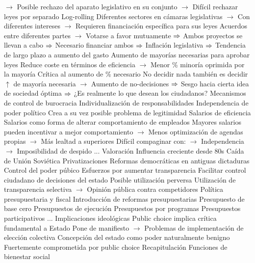 \documentclass{nuevotema}
\begin{document}
\begin{esquemal}
				\4[] $\to$ Posible rechazo del aparato legislativo en su conjunto
				\4[] $\to$ Difícil rechazar leyes por separado
				\4 Log-rolling
				\4[] Diferentes sectores en cámaras legislativas
				\4[] $\to$ Con diferentes intereses
				\4[] $\to$ Requieren financiación específica para sus leyes
				\4[] Acuerdos entre diferentes partes
				\4[] $\to$ Votarse a favor mutuamente
				\4[] $\then$ Ambos proyectos se llevan a cabo
				\4[] $\then$ Necesario financiar ambos
				\4[] $\then$ Inflación legislativa
				\4[] $\then$ Tendencia de largo plazo a aumento del gasto
				\4 Aumento de mayorías necesarias para aprobar leyes
				\4[] Reduce coste en términos de eficiencia
				\4[] $\to$ Menor \% minoría oprimida por la mayoría
				\4 Crítica al aumento de \% necesario
				\4[] No decidir nada también es decidir
				\4[] $\uparrow$ de mayoría necesaria
				\4[] $\to$ Aumento de no-decisiones
				\4[] $\then$ Sesgo hacia cierta idea de sociedad óptima
				\4[] $\then$ ¿Es realmente lo que desean los ciudadanos?
			\3 Mecanismos de control de burocracia
				\4 Individualización de responsabilidades
				\4 Independencia de poder político
				\4[] Crea a su vez posible problema de legitimidad
				\4 Salarios de eficiencia
				\4[] Salarios como forma de alterar comportamiento de empleados
				\4[] Mayores salarios pueden incentivar a mejor comportamiento
				\4[] $\to$ Menos optimización de agendas propias
				\4[] $\to$ Más lealtad a superiores
				\4[] Difícil compaginar con:
				\4[] $\to$ Independencia
				\4[] $\to$ Imposibilidad de despido
				\4 ...
		\2 Valoración
			\3 Influencia creciente desde 80s
				\4 Caída de Unión Soviética
				\4 Privatizaciones
				\4 Reformas democráticas en antiguas dictaduras
			\3 Control del poder púbico
				\4 Esfuerzos por aumentar transparencia
				\4[] Facilitar control ciudadano de decisiones del estado
				\4[$\then$] Posible utilización perversa
				\4[] Utilización de transparencia selectiva
				\4[] $\to$ Opinión pública contra competidores
			\3 Política presupuestaria y fiscal
				\4 Introducción de reformas presupuestarias
				\4 Presupuesto de base cero
				\4 Presupuestos de ejecución
				\4 Presupuestos por programas
				\4 Presupuestos participativos
				\4 ...
			\3 Implicaciones ideológicas
				\4 Public choice implica crítica fundamental a Estado
				\4[] Pone de manifiesto
				\4[] $\to$ Problemas de implementación de elección colectiva
				\4 Concepción del estado como poder naturalmente benigno
				\4[] Fuertemente comprometida por public choice
	\1[] 
		\2 Recapitulación
			\3 Funciones de bienestar social

\end{esquemal}
\end{document}
